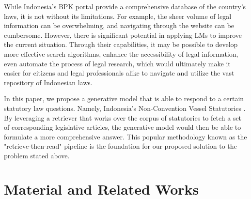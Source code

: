 \documentclass[conference]{IEEEtran}
\begin{document}
While Indonesia's BPK portal \cite{} provide a comprehensive database of the country's laws, it is not without
its limitations. For example, the sheer volume of legal information can be overwhelming, and navigating through
the website can be cumbersome. However, there is significant potential in applying LMs to improve the current
situation. Through their capabilities, it may be possible to develop more effective search algorithms, enhance
the accessibility of legal information, even automate the process of legal research, which would ultimately
make it easier for citizens and legal professionals alike to navigate and utilize the vast repository of
Indonesian laws.

In this paper, we propose a generative model that is able to respond to a certain statutory law questions.
Namely, Indonesia's Non-Convention Vessel Statutories \cite{}. By leveraging a retriever that works over the corpus
of statutories to fetch a set of corresponding legislative articles, the generative model would then be able
to formulate a more comprehensive answer. This popular methodology known as the "retrieve-then-read" pipeline
\cite{} is the foundation for our proposed solution to the problem stated above.



\section{Material and Related Works}

\end{document}
